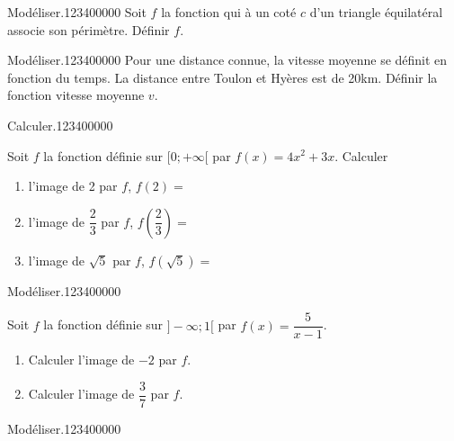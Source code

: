 \begin{pageAD}  %
\restoregeometry %


\begin{ExoCad}{Modéliser.}{1234}{0}{0}{0}{0}{0}
Soit $f$ la fonction qui à un coté $c$ d'un triangle équilatéral associe son périmètre. Définir $f$. 
\end{ExoCad} 


\begin{ExoCad}{Modéliser.}{1234}{0}{0}{0}{0}{0}
Pour une distance connue, la vitesse moyenne se définit en fonction du temps. La distance entre Toulon et Hyères est de 20km. Définir la fonction vitesse moyenne $v$. 
\end{ExoCad} 


\begin{ExoCad}{Calculer.}{1234}{0}{0}{0}{0}{0}

Soit $f$ la fonction définie sur $[0;+\infty[$ par $f(x)= 4x^2+3x$. Calculer

\begin{enumerate}
\item l'image de 2 par $f$, $f(2)=$
\item l'image de $\dfrac{2}{3}$ par $f$, $f\left(\dfrac{2}{3}\right)=$
\item l'image de $\sqrt{5}$ par $f$, $f\left(\sqrt{5}\right)=$
\end{enumerate}
\end{ExoCad} 

 

\begin{ExoCad}{Modéliser.}{1234}{0}{0}{0}{0}{0}

Soit $f$ la fonction définie sur $]-\infty;1[$ par $f(x)= \dfrac{5}{x-1}$. 

\begin{enumerate}
\item Calculer l'image de $-2$ par $f$.  

\item Calculer l'image de $\dfrac{3}{7}$ par $f$. 

\end{enumerate}
\end{ExoCad}


 

\begin{ExoCad}{Modéliser.}{1234}{0}{0}{0}{0}{0}


\end{ExoCad}
\end{pageAD}
